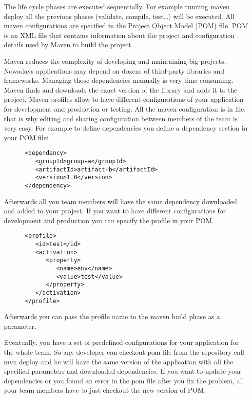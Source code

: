   The life cycle phases are executed sequentially. For  example 
  running maven deploy all the  previous phases (validate, compile, test\ldots) will
  be executed.
  All maven configurations are specified in the Project Object Model (POM) file.
  POM is an XML file that contains information about the project and configuration details used by Maven 
  to build the project. 

  Maven reduces the complexity of developing and maintaining big projects.
  Nowadays applications may depend on dozens of third-party libraries and
  frameworks. Managing those dependencies manually is very time consuming. Maven
  finds  and downloads the exact version of the library and adds it to the
  project. Maven profiles allow to have different configurations of your
  application for development and production or testing. All the maven
  configuration is in file, that is why editing and sharing configuration
  between members of the team is very easy. For example to define dependencies you define a
   dependency section in your POM file:
  \lstset{language=XML}
    \begin{lstlisting}
      <dependency>
         <groupId>group-a</groupId>
         <artifactId>artifact-b</artifactId>
         <version>1.0</version>
      </dependency>
    \end{lstlisting}  

  Afterwards all you team members will have the same dependency downloaded and
  added to your project. If you want to have different configurations for
  development and production you can specify the profile in your POM.
   \lstset{language=XML}
    \begin{lstlisting}
      <profile>
         <id>test</id>
         <activation>
            <property>
               <name>env</name>
               <value>test</value>
            </property>
         </activation>
      </profile>
    \end{lstlisting}
  Afterwards you can pass the profile name to the maven build phase as
  a parameter.

  Eventually, you have a set of predefined configurations for your application
  for the whole team. So any developer can checkout pom file from the repository
  call mvn deploy and he will have the same version of the application with all
  the specified parameters and downloaded dependencies. If you want to update
  your dependencies or you found an error in the pom file after you fix the
  problem, all your team members have to just checkout the new version of POM.
 
